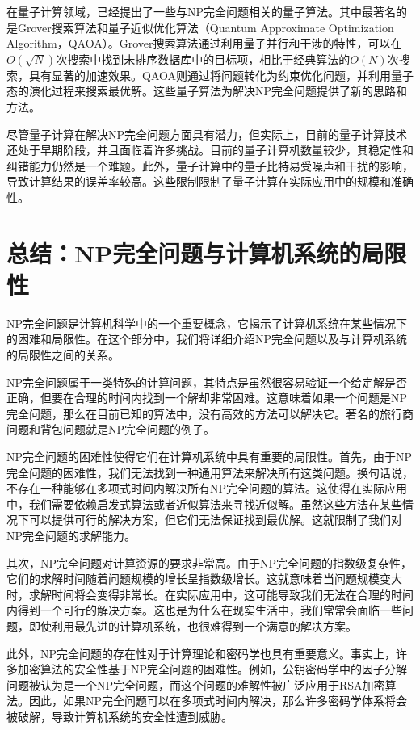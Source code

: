 \documentclass[UTF8,openany,zihao=5]{ctexbook}
\begin{document}
在量子计算领域，已经提出了一些与NP完全问题相关的量子算法。其中最著名的是Grover搜索算法和量子近似优化算法\cite{bi:GG}（Quantum Approximate Optimization Algorithm，QAOA）。Grover搜索算法通过利用量子并行和干涉的特性，可以在$O(\sqrt{N})$次搜索中找到未排序数据库中的目标项，相比于经典算法的$O(N)$次搜索，具有显著的加速效果。QAOA则通过将问题转化为约束优化问题，并利用量子态的演化过程来搜索最优解\cite{bi:GG}。这些量子算法为解决NP完全问题提供了新的思路和方法。

尽管量子计算在解决NP完全问题方面具有潜力，但实际上，目前的量子计算技术还处于早期阶段，并且面临着许多挑战。目前的量子计算机数量较少，其稳定性和纠错能力仍然是一个难题。此外，量子计算中的量子比特易受噪声和干扰的影响，导致计算结果的误差率较高。这些限制限制了量子计算在实际应用中的规模和准确性。

\chapter{总结：NP完全问题与计算机系统的局限性}

NP完全问题是计算机科学中的一个重要概念，它揭示了计算机系统在某些情况下的困难和局限性。在这个部分中，我们将详细介绍NP完全问题以及与计算机系统的局限性之间的关系。

NP完全问题属于一类特殊的计算问题，其特点是虽然很容易验证一个给定解是否正确，但要在合理的时间内找到一个解却非常困难。这意味着如果一个问题是NP完全问题，那么在目前已知的算法中，没有高效的方法可以解决它。著名的旅行商问题和背包问题就是NP完全问题的例子。

NP完全问题的困难性使得它们在计算机系统中具有重要的局限性。首先，由于NP完全问题的困难性，我们无法找到一种通用算法来解决所有这类问题。换句话说，不存在一种能够在多项式时间内解决所有NP完全问题的算法。这使得在实际应用中，我们需要依赖启发式算法或者近似算法来寻找近似解。虽然这些方法在某些情况下可以提供可行的解决方案，但它们无法保证找到最优解。这就限制了我们对NP完全问题的求解能力。

其次，NP完全问题对计算资源的要求非常高。由于NP完全问题的指数级复杂性，它们的求解时间随着问题规模的增长呈指数级增长。这就意味着当问题规模变大时，求解时间将会变得非常长。在实际应用中，这可能导致我们无法在合理的时间内得到一个可行的解决方案。这也是为什么在现实生活中，我们常常会面临一些问题，即使利用最先进的计算机系统，也很难得到一个满意的解决方案。

此外，NP完全问题的存在性对于计算理论和密码学也具有重要意义。事实上，许多加密算法的安全性基于NP完全问题的困难性。例如，公钥密码学中的因子分解问题被认为是一个NP完全问题，而这个问题的难解性被广泛应用于RSA加密算法。因此，如果NP完全问题可以在多项式时间内解决，那么许多密码学体系将会被破解，导致计算机系统的安全性遭到威胁。
\end{document}
